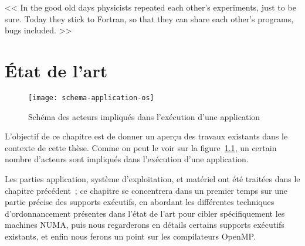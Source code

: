 \begin{savequote}[12cm]
<< In the good old days physicists repeated each other's experiments, just to be sure. Today they stick to Fortran, so that they can share each other's programs, bugs included. >>


\end{savequote}
\chapter{État de l'art}\label{chap:rw}
\chaptertoc


\begin{figure}[ht]
  \centering
  \texttt{[image: schema-application-os]}
  \caption{Schéma des acteurs impliqués dans l'exécution d'une application}\label{fig:rw:application-os}
\end{figure}

L'objectif de ce chapitre est de donner un aperçu des travaux existants dans le contexte de cette thèse.
Comme on peut le voir sur la figure~\ref{fig:rw:application-os}, un certain nombre d'acteurs sont impliqués dans l'exécution d'une application.

Les parties application, système d'exploitation, et matériel ont été traitées dans le chapitre précédent~; ce chapitre se concentrera dans un premier temps sur une partie précise des supports exécutifs, en abordant les différentes techniques d'ordonnancement présentes dans l'état de l'art pour cibler spécifiquement les machines NUMA, puis nous regarderons en détails certains supports exécutifs existants, et enfin nous ferons un point sur les compilateurs OpenMP.















